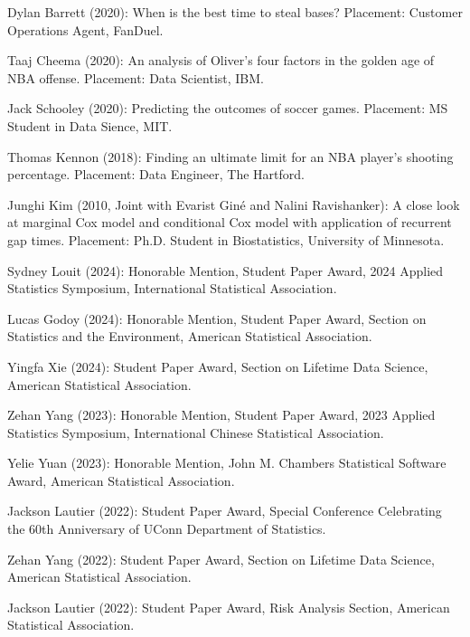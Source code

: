 \documentclass[Statistics]{vita}
\begin{document}
\begin{vita}
\begin{Students}
\begin{UndergraduateHonor}
    \item Dylan Barrett (2020): When is the best time to steal bases? Placement: Customer Operations Agent, FanDuel.
    \item Taaj Cheema (2020): An analysis of Oliver’s four factors in the golden age of NBA offense. Placement: Data Scientist, IBM.
    \item Jack Schooley (2020): Predicting the outcomes of soccer games. Placement: MS Student in Data Sience, MIT.
    \item Thomas Kennon (2018): Finding an ultimate limit for an NBA player's shooting percentage. Placement: Data Engineer, The Hartford.
    \item Junghi Kim (2010, Joint with Evarist Gin\'e and Nalini Ravishanker): A close look at marginal Cox model and conditional Cox model with application of recurrent gap times. Placement: Ph.D. Student in Biostatistics, University of Minnesota.
    \end{UndergraduateHonor}
  \end{Students}
  \begin{TeachingAccomplishments}
    \begin{StudentAwards}
    \item Sydney Louit (2024): Honorable Mention, Student Paper Award, 2024 Applied Statistics Symposium, International Statistical Association.
    \item Lucas Godoy (2024): Honorable Mention, Student Paper Award, Section on Statistics and the Environment, American Statistical Association.
    \item Yingfa Xie (2024): Student Paper Award, Section on Lifetime Data Science, American Statistical Association.
    \item Zehan Yang (2023): Honorable Mention, Student Paper Award, 2023 Applied Statistics Symposium, International Chinese Statistical Association.
    \item Yelie Yuan (2023): Honorable Mention, John M. Chambers Statistical Software Award, American Statistical Association.
    \item Jackson Lautier (2022): Student Paper Award, Special Conference Celebrating the 60th Anniversary of UConn Department of Statistics.
    \item Zehan Yang (2022): Student Paper Award, Section on Lifetime Data Science, American Statistical Association.
    \item Jackson Lautier (2022): Student Paper Award, Risk Analysis Section, American Statistical Association.

\end{StudentAwards}
\end{TeachingAccomplishments}
\end{vita}
\end{document}
